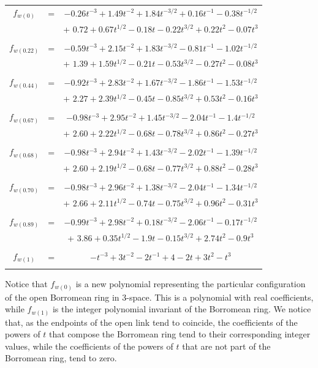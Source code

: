 \documentclass{article}
\begin{document}
\newpage 

\begin{tabular}{c c c}
     $f_{w(0)}$ &= & $ -0.26 t^{-3} +1.49 t^{-2} + 1.84 t^{-3/2} + 0.16 t^{-1} -0.38 t^{-1/2}$\\
     & & + $0.72 + 0.67 t^{1/2} -0.18 t -0.22 t^{3/2} +0.22 t^2 -0.07 t^3$\\
     \\
     $f_{w(0.22)}$ & =&  $ -0.59 t^{-3} +2.15 t^{-2} + 1.83 t^{-3/2} -0.81 t^{-1} -1.02 t^{-1/2}$\\
     & & + $1.39 + 1.59 t^{1/2} -0.21 t -0.53 t^{3/2} -0.27 t^2 -0.08 t^3$\\
     \\
     $f_{w(0.44)}$ & =&  $ -0.92 t^{-3} +2.83 t^{-2} + 1.67 t^{-3/2} -1.86 t^{-1} -1.53 t^{-1/2}$\\
     & & + $2.27 + 2.39 t^{1/2} -0.45 t -0.85 t^{3/2} +0.53 t^2 -0.16 t^3$\\
     \\
     $f_{w(0.67)}$ &= & $ -0.98 t^{-3} +2.95 t^{-2} + 1.45 t^{-3/2} -2.04 t^{-1} -1.4 t^{-1/2}$\\
     & & + $2.60 + 2.22 t^{1/2} -0.68 t -0.78 t^{3/2} +0.86 t^2 -0.27 t^3$\\
     \\
     $f_{w(0.68)}$ & =& $ -0.98 t^{-3} +2.94 t^{-2} + 1.43 t^{-3/2} -2.02 t^{-1} -1.39 t^{-1/2}$\\
     & & + $2.60 + 2.19 t^{1/2} -0.68 t -0.77 t^{3/2} +0.88 t^2 -0.28 t^3$\\
     \\
     $f_{w(0.70)}$ & =& $ -0.98 t^{-3} +2.96 t^{-2} + 1.38 t^{-3/2} -2.04 t^{-1} -1.34 t^{-1/2}$\\
     & & + $2.66 + 2.11 t^{1/2} -0.74 t -0.75 t^{3/2} +0.96 t^2 -0.31 t^3$\\
     \\
     $f_{w(0.89)}$ &= & $ -0.99 t^{-3} +2.98 t^{-2} + 0.18 t^{-3/2} -2.06 t^{-1} -0.17 t^{-1/2}$\\
     & & + $3.86 + 0.35 t^{1/2} -1.9 t -0.15 t^{3/2} +2.74 t^2 -0.9 t^3$\\
     \\
     $f_{w(1)}$ &= & $ -t^{-3} + 3 t^{-2} -2 t^{-1} + 4 -2 t  + 3 t^2 -t^3$\\
     \\
\end{tabular}


Notice that $f_{w(0)}$ is a new polynomial representing the particular configuration of the open Borromean ring in 3-space. This is a polynomial with real coefficients, while $f_{w(1)}$ is the integer polynomial invariant of the Borromean ring. We notice that, as the endpoints of the open link tend to coincide, the coefficients of the powers of $t$ that compose the Borromean ring tend to their corresponding integer values, while the coefficients of the powers of $t$ that are not part of the Borromean ring, tend to zero.
\end{document}
